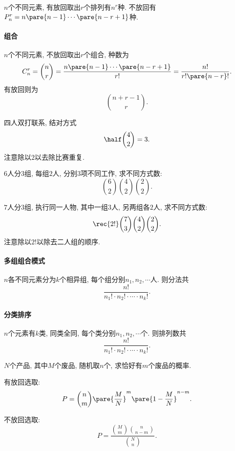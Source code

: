 \documentclass[../Statistics.tex]{subfiles}
\begin{document}
$n$个不同元素, 有放回取出$r$个排列有$n^r$种. 不放回有$P_n^r = n\pare{n-1}\cdots\pare{n-r+1}$种.   


\paragraph{组合} %
\label{par:组合}

$n$个不同元素, 不放回取出$r$个组合, 种数为
\[ C_n^r = \binom{n}{r} = \frac{n\pare{n-1}\cdots \pare{n-r+1}}{r!} = \frac{n!}{r!\pare{n-r}!}. \]
有放回则为
\[ \binom{n+r-1}{r}. \]


\begin{sample}
    \begin{ex}
        四人双打联系, 结对方式
        \[ \half\binom{4}{2} = 3. \]
        注意除以$2$以去除比赛重复.
    \end{ex}
    \begin{ex}
        $6$人分$3$组, 每组$2$人, 分别$3$项不同工作, 求不同方式数:
        \[ \binom{6}{2}\binom{4}{2}\binom{2}{2}. \]
    \end{ex}
    \begin{ex}
        $7$人分$3$组, 执行同一人物, 其中一组$3$人, 另两组各$2$人, 求不同方式数:
        \[ \rec{2!}\binom{7}{3}\binom{4}{2}\binom{2}{2}. \]
        注意除以$2!$以除去二人组的顺序.
    \end{ex}
\end{sample}
\paragraph{多组组合模式} %
\label{par:多组组合模式}

$n$各不同元素分为$k$个相异组, 每个组分别$n_1,n_2,\cdots$人. 则分法共
\[ \frac{n!}{n_1!\cdot n_2!\cdot\cdots\cdot n_k!}. \]


\paragraph{分类排序} %
\label{par:分类排序}

$n$个元素有$k$类, 同类全同, 每个类分别$n_1,n_2,\cdots$个. 则排列数共
\[ \frac{n!}{n_1!\cdot n_2!\cdot\cdots\cdot n_k!}. \]


\begin{sample}
    \begin{ex}
        $N$个产品, 其中$M$个废品, 随机取$n$个, 求恰好有$m$个废品的概率.
        \begin{cenum}
            \item 有放回选取:
            \[ P = \binom{n}{m}\pare{\frac{M}{N}}^m\pare{1-\frac{M}{N}}^{n-m}. \]
            \item 不放回选取:
            \[ P = \frac{\binom{M}{m}\binom{n}{n-m}}{\binom{N}{n}}. \]
        \end{cenum}
    \end{ex}
\end{sample}
\end{document}
